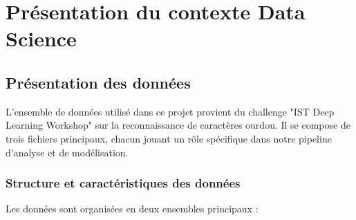 
\chapter{Présentation du contexte Data Science}
\section{Présentation des données}
\begin{flushleft}
L'ensemble de données utilisé dans ce projet provient du challenge "IST Deep Learning Workshop" sur la reconnaissance de caractères ourdou. Il se compose de trois fichiers principaux, chacun jouant un rôle spécifique dans notre pipeline d'analyse et de modélisation.
\end{flushleft}
\subsection{Structure et caractéristiques des données}
Les données sont organisées en deux ensembles principaux :

